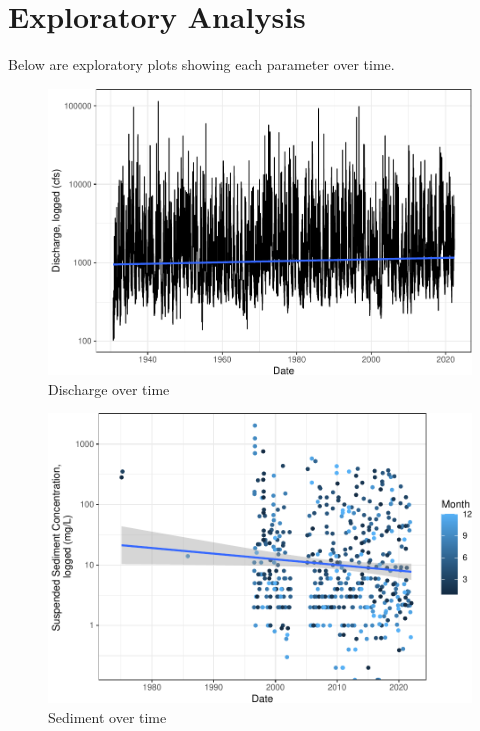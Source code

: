 \documentclass[
  12pt,
]{article}
\begin{document}
\newpage

\hypertarget{exploratory-analysis}{%
\section{Exploratory Analysis}\label{exploratory-analysis}}

Below are exploratory plots showing each parameter over time.

\begin{figure}
\centering
\includegraphics{Project_Script_files/figure-latex/exploration_plot1-1.pdf}
\caption{Discharge over time}
\end{figure}

\begin{figure}
\centering
\includegraphics{Project_Script_files/figure-latex/exploration_plot2-1.pdf}
\caption{Sediment over time}
\end{figure}
\end{document}
